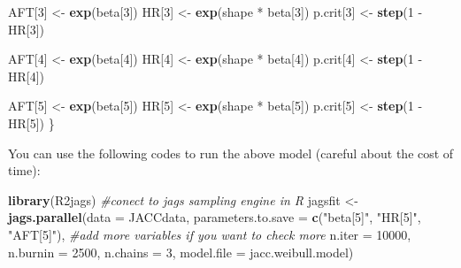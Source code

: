 \documentclass[]{tufte-handout}
\newenvironment{Shaded}{}{}
\newcommand{\CommentTok}[1]{\textcolor[rgb]{0.38,0.63,0.69}{\textit{#1}}}
\newcommand{\DataTypeTok}[1]{\textcolor[rgb]{0.56,0.13,0.00}{#1}}
\newcommand{\DecValTok}[1]{\textcolor[rgb]{0.25,0.63,0.44}{#1}}
\newcommand{\KeywordTok}[1]{\textcolor[rgb]{0.00,0.44,0.13}{\textbf{#1}}}
\newcommand{\NormalTok}[1]{#1}
\newcommand{\OperatorTok}[1]{\textcolor[rgb]{0.40,0.40,0.40}{#1}}
\newcommand{\StringTok}[1]{\textcolor[rgb]{0.25,0.44,0.63}{#1}}
\begin{document}
\begin{Shaded}
\begin{Highlighting}[]
\NormalTok{  AFT[}\DecValTok{3}\NormalTok{] <-}\StringTok{ }\KeywordTok{exp}\NormalTok{(beta[}\DecValTok{3}\NormalTok{])}
\NormalTok{  HR[}\DecValTok{3}\NormalTok{] <-}\StringTok{ }\KeywordTok{exp}\NormalTok{(shape }\OperatorTok{*}\StringTok{ }\NormalTok{beta[}\DecValTok{3}\NormalTok{])}
\NormalTok{  p.crit[}\DecValTok{3}\NormalTok{] <-}\StringTok{ }\KeywordTok{step}\NormalTok{(}\DecValTok{1} \OperatorTok{-}\StringTok{ }\NormalTok{HR[}\DecValTok{3}\NormalTok{])}
  
\NormalTok{  AFT[}\DecValTok{4}\NormalTok{] <-}\StringTok{ }\KeywordTok{exp}\NormalTok{(beta[}\DecValTok{4}\NormalTok{])}
\NormalTok{  HR[}\DecValTok{4}\NormalTok{] <-}\StringTok{ }\KeywordTok{exp}\NormalTok{(shape }\OperatorTok{*}\StringTok{ }\NormalTok{beta[}\DecValTok{4}\NormalTok{])}
\NormalTok{  p.crit[}\DecValTok{4}\NormalTok{] <-}\StringTok{ }\KeywordTok{step}\NormalTok{(}\DecValTok{1} \OperatorTok{-}\StringTok{ }\NormalTok{HR[}\DecValTok{4}\NormalTok{])}
  
\NormalTok{  AFT[}\DecValTok{5}\NormalTok{] <-}\StringTok{ }\KeywordTok{exp}\NormalTok{(beta[}\DecValTok{5}\NormalTok{])}
\NormalTok{  HR[}\DecValTok{5}\NormalTok{] <-}\StringTok{ }\KeywordTok{exp}\NormalTok{(shape }\OperatorTok{*}\StringTok{ }\NormalTok{beta[}\DecValTok{5}\NormalTok{])}
\NormalTok{  p.crit[}\DecValTok{5}\NormalTok{] <-}\StringTok{ }\KeywordTok{step}\NormalTok{(}\DecValTok{1} \OperatorTok{-}\StringTok{ }\NormalTok{HR[}\DecValTok{5}\NormalTok{])}
\NormalTok{\}}
\end{Highlighting}
\end{Shaded}

You can use the following codes to run the above model (careful about
the cost of time):

\begin{Shaded}
\begin{Highlighting}[]
\KeywordTok{library}\NormalTok{(R2jags) }\CommentTok{#conect to jags sampling engine in R}
\NormalTok{jagsfit <-}\StringTok{ }\KeywordTok{jags.parallel}\NormalTok{(}\DataTypeTok{data =}\NormalTok{ JACCdata,}
                         \DataTypeTok{parameters.to.save =} \KeywordTok{c}\NormalTok{(}\StringTok{"beta[5]"}\NormalTok{, }\StringTok{"HR[5]"}\NormalTok{, }\StringTok{"AFT[5]"}\NormalTok{),}
                         \CommentTok{#add more variables if you want to check more}
                         \DataTypeTok{n.iter =} \DecValTok{10000}\NormalTok{, }
                         \DataTypeTok{n.burnin =} \DecValTok{2500}\NormalTok{, }
                         \DataTypeTok{n.chains =} \DecValTok{3}\NormalTok{,}
                         \DataTypeTok{model.file =}\NormalTok{ jacc.weibull.model)}
\end{Highlighting}
\end{Shaded}
\end{document}
